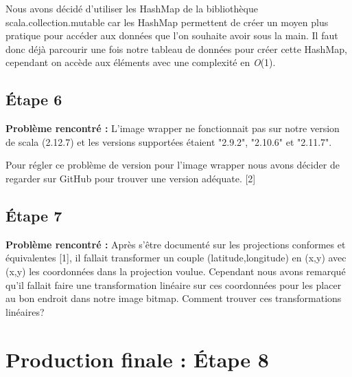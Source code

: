 \documentclass{article}
\begin{document}
\vspace{1\baselineskip}

 \newline
Nous avons décidé d'utiliser les HashMap de la bibliothèque scala.collection.mutable car les HashMap permettent de créer un moyen plus pratique pour accéder aux données que l'on souhaite avoir sous la main. Il faut donc déjà parcourir une fois notre tableau de données pour créer cette HashMap, cependant on accède aux éléments avec une complexité en \textit{O}(1).

\vspace{1\baselineskip}

\subsection{Étape 6} 


\textbf{Problème rencontré :} \newline
L'image wrapper ne fonctionnait pas sur notre version de scala (2.12.7) et les versions supportées étaient "2.9.2", "2.10.6" et "2.11.7".

\vspace{1\baselineskip}

 \newline
Pour régler ce problème de version pour l'image wrapper nous avons décider de regarder sur GitHub pour trouver une version adéquate. [2]


\subsection{Étape 7}


\textbf{Problème rencontré :} \newline
Après s'être documenté sur les projections conformes et équivalentes [1], il fallait transformer un couple (latitude,longitude) en (x,y) avec (x,y) les coordonnées dans la projection voulue. Cependant nous avons remarqué qu'il fallait faire une transformation linéaire sur ces coordonnées pour les placer au bon endroit dans notre image bitmap. Comment trouver ces transformations linéaires?

\vspace{1\baselineskip}




 \section{ Production finale : Étape 8}
\end{document}
